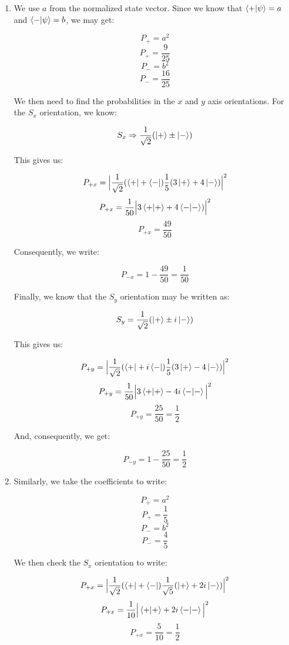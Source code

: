 \begin{enumerate}
\begin{enumerate}
\begin{enumerate}
          \item We use $a$ from the normalized state vector. Since we know that $\bra{+}\ket{\psi}=a$ and $\bra{-}\ket{\psi}=b$, we may get:

            $$P_+=a^2$$
            $$\boxed{P_+=\frac{9}{25}}$$
            $$P_-=b^2$$
            $$\boxed{P_-=\frac{16}{25}}$$

            We then need to find the probabilities in the $x$ and $y$ axis orientations. For the $S_x$ orientation, we know:

            $$S_x\Rightarrow \frac{1}{\sqrt{2}}(\ket{+}\pm \ket{-})$$

            This gives us:

            $$P_{+x}=\Big|\frac{1}{\sqrt{2}}(\bra{+}+\bra{-})\frac{1}{5}(3\ket{+}+4\ket{-})\Big|^2$$
            $$P_{+x}=\frac{1}{50}\Big|3\braket{+}+4\braket{-})\Big|^2$$
            $$\boxed{P_{+x}=\frac{49}{50}}$$

            Consequently, we write:

            $$\boxed{P_{-x}=1-\frac{49}{50}=\frac{1}{50}}$$

            Finally, we know that the $S_y$ orientation may be written as:

            $$S_y=\frac{1}{\sqrt{2}}(\ket{+}\pm i\ket{-})$$

            This gives us:

            $$P_{+y}=\Big|\frac{1}{\sqrt{2}}(\bra{+}+i\bra{-})\frac{1}{5}(3\ket{+}-4\ket{-})\Big|^2$$
            $$P_{+y}=\frac{1}{50}\Big|3\braket{+}-4i\braket{-}\Big|^2$$
            $$\boxed{P_{+y}=\frac{25}{50}=\frac{1}{2}}$$

            And, consequently, we get:

            $$\boxed{P_{-y}=1-\frac{25}{50}=\frac{1}{2}}$$

          \item Similarly, we take the coefficients to write:

            $$P_+=a^2$$
            $$\boxed{P_+=\frac{1}{5}}$$
            $$P_-=b^2$$
            $$\boxed{P_-=\frac{4}{5}}$$

            We then check the $S_x$ orientation to write:

            $$P_{+x}=\Big|\frac{1}{\sqrt{2}}(\bra{+}+\bra{-})\frac{1}{\sqrt{5}}(\ket{+}+2i\ket{-})\Big|^2$$
            $$P_{+x}=\frac{1}{10}\Big|\braket{+}+2i\braket{-}\Big|^2$$
            $$\boxed{P_{+x}=\frac{5}{10}=\frac{1}{2}}$$


\end{enumerate}
\end{enumerate}
\end{enumerate}
